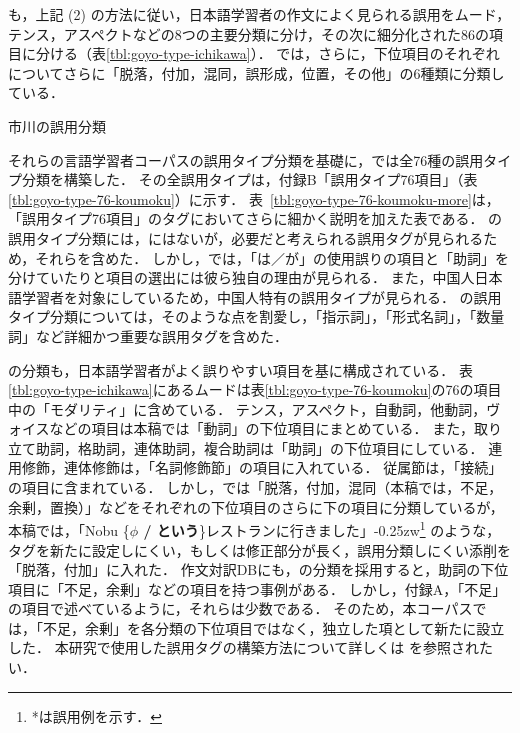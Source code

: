 \documentclass[japanese]{jnlp_1.4}
\newcommand{\ngc}{}
\begin{document}
も，上記 (2) の方法に従い，日本語学習者の作文によく見られる誤用をムード，テンス，アスペクトなどの8つの主要分類に分け，その次に細分化された86の項目に分ける（表\ref{tbl:goyo-type-ichikawa}）．
では，さらに，下位項目のそれぞれについてさらに「脱落，付加，混同，誤形成，位置，その他」の6種類に分類している．

\begin{table}[b]
\caption{市川の誤用分類}
\label{tbl:goyo-type-ichikawa}

\end{table}

それらの言語学習者コーパスの誤用タイプ分類を基礎に，\ngc\hbox{}では全76種の誤用タイプ分類を構築した．
その全誤用タイプは，付録B「誤用タイプ76項目」（表\ref{tbl:goyo-type-76-koumoku}）に示す．
表~\ref{tbl:goyo-type-76-koumoku-more}は，「誤用タイプ76項目」のタグにおいてさらに細かく説明を加えた表である．
の誤用タイプ分類には，にはないが，必要だと考えられる誤用タグが見られるため，それらを含めた．
しかし，では，「は／が」の使用誤りの項目と「助詞」を分けていたりと項目の選出には彼ら独自の理由が見られる．
また，中国人日本語学習者を対象にしているため，中国人特有の誤用タイプが見られる．
\ngc\hbox{}の誤用タイプ分類については，そのような点を割愛し，「指示詞」，「形式名詞」，「数量詞」など詳細かつ重要な誤用タグを含めた．

の分類も，日本語学習者がよく誤りやすい項目を基に構成されている．
表\ref{tbl:goyo-type-ichikawa}にあるムードは表\ref{tbl:goyo-type-76-koumoku}の76の項目中の「モダリティ」に含めている．
テンス，アスペクト，自動詞，他動詞，ヴォイスなどの項目は本稿では「動詞」の下位項目にまとめている．
また，取り立て助詞，格助詞，連体助詞，複合助詞は「助詞」の下位項目にしている．
連用修飾，連体修飾は，「名詞修飾節」の項目に入れている．
従属節は，「接続」の項目に含まれている．
しかし，では「脱落，付加，混同（本稿では，不足，余剰，置換）」などをそれぞれの下位項目のさらに下の項目に分類しているが，本稿では，「Nobu \{{\bf * $\phi$ / という}\}レストランに行きました」{\kern-0.25zw}\footnote{*は誤用例を示す．} のような，タグを新たに設定しにくい，もしくは修正部分が長く，誤用分類しにくい添削を「脱落，付加」に入れた．
作文対訳DBにも，の分類を採用すると，助詞の下位項目に「不足，余剰」などの項目を持つ事例がある．
しかし，付録A，「不足」の項目で述べているように，それらは少数である．
そのため，本コーパスでは，「不足，余剰」を各分類の下位項目ではなく，独立した項として新たに設立した．
本研究で使用した誤用タグの構築方法について詳しくは を参照されたい．
\end{document}
